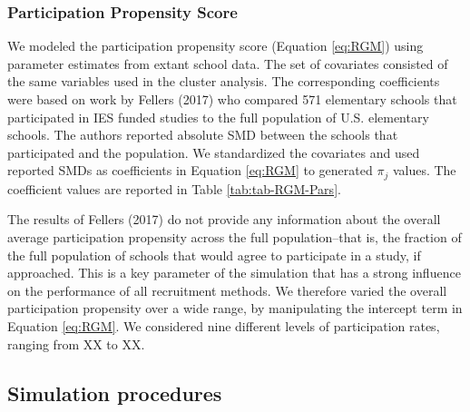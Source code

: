 \documentclass[
  english,
  man,floatsintext]{apa6}
\begin{document}
\hypertarget{participation-propensity-score}{%
\subsubsection{Participation Propensity Score}\label{participation-propensity-score}}

We modeled the participation propensity score (Equation \eqref{eq:RGM}) using parameter estimates from extant school data. The set of covariates consisted of the same variables used in the cluster analysis. The corresponding coefficients were based on work by Fellers (2017) who compared 571 elementary schools that participated in IES funded studies to the full population of U.S. elementary schools. The authors reported absolute SMD between the schools that participated and the population. We standardized the covariates and used reported SMDs as coefficients in Equation \eqref{eq:RGM} to generated \(\pi_j\) values. The coefficient values are reported in Table \ref{tab:tab-RGM-Pars}.

The results of Fellers (2017) do not provide any information about the overall average participation propensity across the full population--that is, the fraction of the full population of schools that would agree to participate in a study, if approached. This is a key parameter of the simulation that has a strong influence on the performance of all recruitment methods. We therefore varied the overall participation propensity over a wide range, by manipulating the intercept term in Equation \eqref{eq:RGM}. We considered nine different levels of participation rates, ranging from XX to XX.

\hypertarget{simulation-procedures}{%
\subsection{Simulation procedures}\label{simulation-procedures}}
\end{document}
